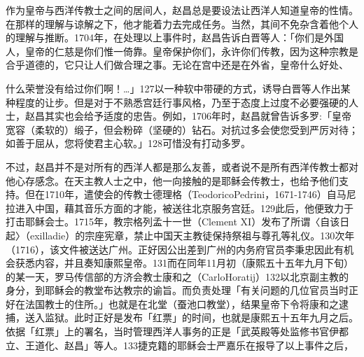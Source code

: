 作为皇帝与西洋传教士之间的居间人，赵昌总是要设法让西洋人知道皇帝的性情。在那样的理解与谅解之下，他才能着力去完成任务。当然，其间不免杂含着他个人的理解与推断。1704年，在处理以上事件时，赵昌告诉白晋等人：「你们是外国人，皇帝的仁慈是你们惟一倚靠。皇帝保护你们，永许你们传教，因为这种宗教是合乎道德的，它只让人们做合理之事。无论在宫中还是在外省，皇帝什么好处、

\vfill
\begin{BookNotes}
\end{BookNotes}

\noindent 什么荣誉没有给过你们啊！…」127以一种软中带硬的方式，诱导白晋等人作出某种程度的让步。但是对于不熟悉宫廷行事风格，乃至于态度上过度不必要强硬的人士，赵昌其实也会给予适度的忠告。例如，1706年时，赵昌就曾告诉多罗:「皇帝宽容（柔软的）缎子，但会粉碎（坚硬的）钻石。对抗过多会使您受到严厉对待；如善于屈从，您将使君主心软。」128可惜没有打动多罗。

不过，赵昌并不是对所有的西洋人都是那么友善，或者说不是所有西洋传教士都对他心存感念。在天主教人士之中，他一向接触的是耶稣会传教士，也给予他们支持。但在1710年，遣使会的传教士德理格（TeodoricoPedrini，1671-1746）自马尼拉进入中国，藉其音乐方面的才能，被送往北京服务宫廷。129此后，他便致力于打击耶稣会士。1715年，教宗格列孟十一世（Clement XI）发布了所谓〈自该日起〉（exilladie）的宗座宪章，禁止中国天主教徒保持祭祖与尊孔等礼仪。130次年（1716），该文件被送达广州。正好因公出差到广州的内务府官员李秉忠因此有机会获悉内容，并且奏知康熙皇帝。131而在同年11月初（康熙五十五年九月下旬）的某一天，罗马传信部的方济会教士康和之（CarloHoratij）132以北京副主教的身分，到耶稣会的教堂布达教宗的谕旨。而负责处理「有关问题的几位官员当时正好在法国教士的住所。」也就是在北堂（蚕池口教堂），结果皇帝下令将康和之逮捕，送入监狱。此时正好是发布「红票」的时间，也就是康熙五十五年九月之后。依据「红票」上的署名，当时管理西洋人事务的正是「武英殿等处监修书官伊都立、王道化、赵昌」等人。133捷克籍的耶稣会士严嘉乐在报导了以上事件之后，

